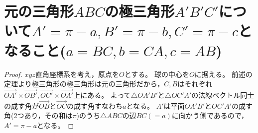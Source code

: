     \section{元の三角形\texorpdfstring{$ABC$}{ABC}の極三角形\texorpdfstring{$A'B'C'$}{A'B'C'}について\texorpdfstring{$A'=\pi-a,B'=\pi-b,C'=\pi-c$}{A'=π-a, B'=π-b, C'=π-c}となること(\texorpdfstring{$a=BC,b=CA,c=AB$}{a=BC, b=CA, c=AB})}
        \begin{proof}
            $xyz$直角座標系を考え，原点を$O$とする。
            球の中心を$O$に据える。
            前述の定理より極三角形の極三角形は元の三角形だから，$C,B$はそれぞれ$\overrightarrow{OA'}\times\overrightarrow{OB'},\overrightarrow{OC'}\times\overrightarrow{OA'}$上にある。
            よって$\triangle OA'B'$と$\triangle OC'A'$の法線ベクトル同士の成す角が$\overrightarrow{OB}$と$\overrightarrow{OC}$の成す角すなわち$a$となる。
            $A'$は平面$OA'B'$と$OC'A'$の成す角(2つあり，その和は$\pi$)のうち$\triangle ABC$の辺$BC(=a)$に向かう側であるので，$A' = \pi-a$となる。
        \end{proof}